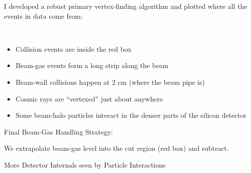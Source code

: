 \begin{slide*}
\slideframe{}
\begin{minipage}[t]{\linewidth}
\Large \black

I developed a robust primary vertex-finding algorithm and plotted
where all the events in data come from:

\vspace{0.5cm}

\begin{center}
  \vspace{-0.25cm}  \vspace{-1.1cm}\\
\end{center}

\vspace{1cm}

\begin{itemize}

  \item Collision events are inside the red box

  \item Beam-gas events form a long strip along the beam

  \item Beam-wall collisions happen at 2 cm (where the beam pipe is)

  \item Cosmic rays are ``vertexed'' just about anywhere

  \item Some beam-halo particles interact in the denser parts of the
  silicon detector

\end{itemize}

\vspace{1cm}

{\huge Final Beam-Gas Handling Strategy:}

\vspace{0.5cm}

We extrapolate beam-gas level into the cut region (red box) and
subtract.

\end{minipage}
\end{slide*}


\begin{slide*}
\slideframe{}
\begin{minipage}[t]{\linewidth}

\begin{center}
  {\LARGE \black More Detector Internals seen by Particle Interactions} \\

  \vspace{0.75cm}

\end{center}

\end{minipage}
\end{slide*}

